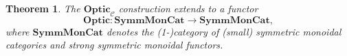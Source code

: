 \documentclass[11pt,letterpaper]{article}
\theoremstyle{plain}
\newtheorem{theorem}{Theorem}[subsection]
\theoremstyle{definition}
\newcommand{\C}{\mathscr{C}}
\newcommand{\SymmMonCat}{\mathbf{SymmMonCat}}
\newcommand{\Optic}{\mathbf{Optic}}
\newcommand{\todo}[1]{\textcolor{red}{\small #1}}
\begin{document}
\begin{theorem}\label{thm:optic-functor}
  The $\Optic_\C$ construction extends to a functor \[\Optic : \SymmMonCat \to \SymmMonCat,\] where $\SymmMonCat$ denotes the (1-)category of (small) symmetric monoidal categories and strong symmetric monoidal functors.
\end{theorem}


\end{document}
